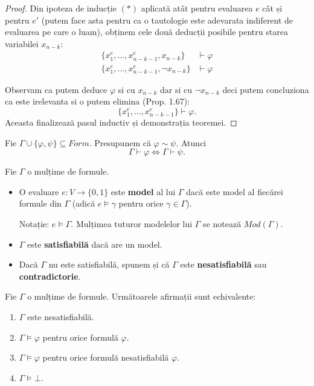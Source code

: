 \begin{proof}
    Din ipoteza de inducție $(*)$ aplicată atât pentru evaluarea $e$ cât și pentru $e'$ (putem face asta pentru ca o tautologie este adevarata indiferent de evaluarea pe care o luam), obținem cele două deducții posibile pentru starea variabilei $x_{n-k}$:
    \begin{align*}
        \{x_1^e, \dots, x_{n-k-1}^e, x_{n-k}\} &\vdash \varphi \\
        \{x_1^e, \dots, x_{n-k-1}^e, \neg x_{n-k}\} &\vdash \varphi
    \end{align*}

    Observam ca putem deduce $\varphi$ si cu $x_{n-k}$ dar si cu $\neg x_{n-k}$ deci putem concluziona ca este irelevanta si o putem elimina (Prop. 1.67):
    \[
        \{x_1^e, \dots, x_{n-k-1}^e\} \vdash \varphi.
    \]
    Aceasta finalizează pasul inductiv și demonstrația teoremei.
\end{proof}


\begin{prop}
    Fie $\Gamma \cup \{\varphi, \psi\} \subseteq Form$. Presupunem că $\varphi \sim \psi$. Atunci
    \[
        \Gamma \vdash \varphi \iff \Gamma \vdash \psi.
    \]
\end{prop}

Fie $\Gamma$ o mulțime de formule.

\begin{definition}
    \begin{itemize}
        \item O evaluare $e : V \to \{0, 1\}$ este \textbf{model} al lui $\Gamma$ dacă este model al fiecărei formule din $\Gamma$ (adică $e \models \gamma$ pentru orice $\gamma \in \Gamma$).

              Notație: $e \models \Gamma$. Mulțimea tuturor modelelor lui $\Gamma$ se notează $Mod(\Gamma)$.

        \item $\Gamma$ este \textbf{satisfiabilă} dacă are un model.

        \item Dacă $\Gamma$ nu este satisfiabilă, spunem și că $\Gamma$ este \textbf{nesatisfiabilă} sau \textbf{contradictorie}.
    \end{itemize}
\end{definition}


\begin{prop}
    Fie $\Gamma$ o mulțime de formule. Următoarele afirmații sunt echivalente:
    \begin{enumerate}
        \item[(i)] $\Gamma$ este nesatisfiabilă.
        \item[(ii)] $\Gamma \models \varphi$ pentru orice formulă $\varphi$.
        \item[(iii)] $\Gamma \models \varphi$ pentru orice formulă nesatisfiabilă $\varphi$.
        \item[(iv)] $\Gamma \models \bot$.
    \end{enumerate}
\end{prop}

